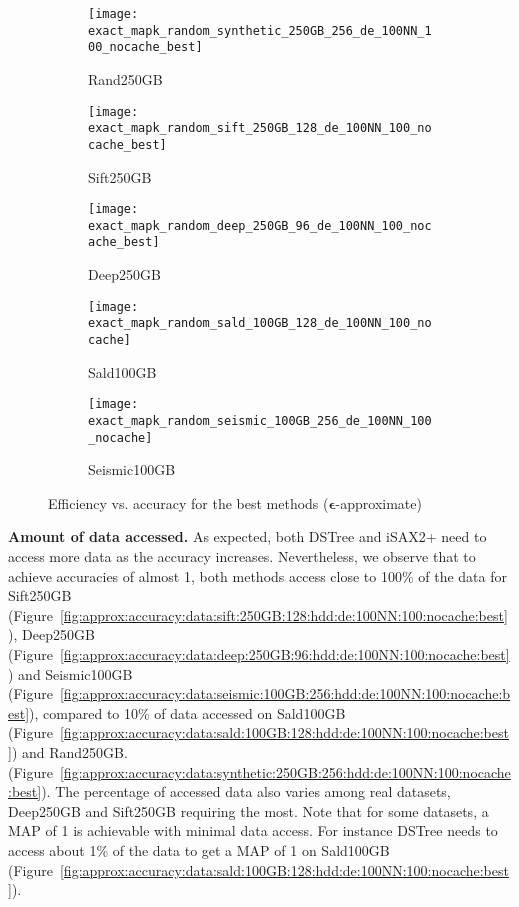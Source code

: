 {{\begin{figure*}[tb]
\begin{minipage}{0.76\textwidth}
	\begin{subfigure}{0.18\textwidth}
		\centering
		\texttt{[image: exact\_mapk\_random\_synthetic\_250GB\_256\_de\_100NN\_100\_nocache\_best]}
		\caption{Rand250GB} 
		\label{fig:approx:accuracy:random:synthetic:250GB:256:hdd:de:100NN:100:nocache:best}
	\end{subfigure}
	\begin{subfigure}{0.18\textwidth}
		\centering
		\texttt{[image: exact\_mapk\_random\_sift\_250GB\_128\_de\_100NN\_100\_nocache\_best]}
		\caption{Sift250GB} 
		\label{fig:approx:accuracy:random:sift:250GB:128:hdd:de:100NN:100:nocache:best}
	\end{subfigure}
	\begin{subfigure}{0.18\textwidth}
		\centering
		\texttt{[image: exact\_mapk\_random\_deep\_250GB\_96\_de\_100NN\_100\_nocache\_best]}
		\caption{Deep250GB} 
		\label{fig:approx:accuracy:random:deep:250GB:96:hdd:de:100NN:100:nocache:best}
	\end{subfigure}
	\begin{subfigure}{0.18\textwidth}
		\centering
		\texttt{[image: exact\_mapk\_random\_sald\_100GB\_128\_de\_100NN\_100\_nocache]}
		\caption{Sald100GB} 
		\label{fig:approx:accuracy:random:sald:100GB:128:hdd:de:100NN:100:nocache:best}
	\end{subfigure}
	\begin{subfigure}{0.18\textwidth}
		\centering
		\texttt{[image: exact\_mapk\_random\_seismic\_100GB\_256\_de\_100NN\_100\_nocache]}
		\caption{Seismic100GB} 
		\label{fig:approx:accuracy:random:seismic:100GB:256:hdd:de:100NN:100:nocache:best}
	\end{subfigure}
	\caption{{\color{black} Efficiency vs. accuracy for the best methods ($\bm{\epsilon}$-approximate)}}
	\label{fig:approx:accuracy:data:250GB:hdd:best}
\end{minipage}
\end{figure*}

\noindent\textbf{Amount of data accessed.} 
As expected, both DSTree and iSAX2+ need to access more data as the accuracy increases. 
Nevertheless, we observe that to achieve accuracies of almost 1, both methods access close to 100\% of the data for Sift250GB  (Figure~\ref{fig:approx:accuracy:data:sift:250GB:128:hdd:de:100NN:100:nocache:best}), Deep250GB (Figure~\ref{fig:approx:accuracy:data:deep:250GB:96:hdd:de:100NN:100:nocache:best}) and Seismic100GB (Figure~\ref{fig:approx:accuracy:data:seismic:100GB:256:hdd:de:100NN:100:nocache:best}), compared to 10\% of data accessed on Sald100GB (Figure~\ref{fig:approx:accuracy:data:sald:100GB:128:hdd:de:100NN:100:nocache:best}) and Rand250GB. (Figure~\ref{fig:approx:accuracy:data:synthetic:250GB:256:hdd:de:100NN:100:nocache:best}). 
The percentage of accessed data also varies among real datasets, Deep250GB and Sift250GB requiring the most. Note that for some datasets, a MAP of 1 is achievable with minimal data access. For instance DSTree needs to access about 1\% of the data to get a MAP of 1 on Sald100GB (Figure~\ref{fig:approx:accuracy:data:sald:100GB:128:hdd:de:100NN:100:nocache:best}).

}}
